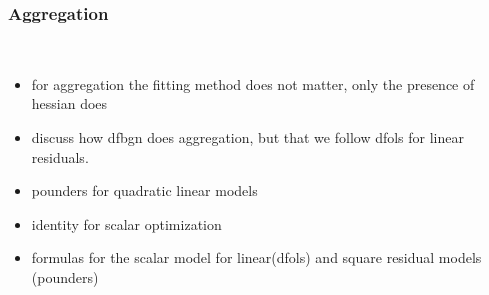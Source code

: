 \subsubsection{Aggregation}
\label{subsubsec:aggregation}
\hfill\\

\begin{itemize}
    \item for aggregation the fitting method does not matter, only the presence of hessian does
    \item discuss how dfbgn does aggregation, but that we follow dfols for linear residuals.
    \item pounders for quadratic linear models
    \item identity for scalar optimization
    \item formulas for the scalar model for linear(dfols) and square residual models (pounders)
\end{itemize}
